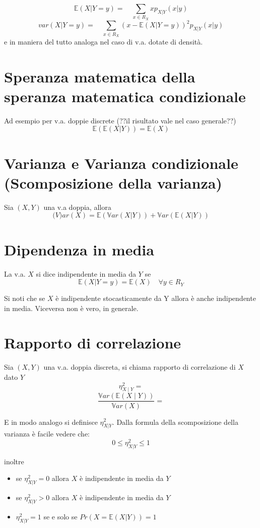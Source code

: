 \documentclass[a4paper]{report}
\begin{document}
  \[\mathbb{E}(X|Y=y)= \quad \sum_{x \in R_X} x p_{X|Y}(x|y) \]
  \[ var(X|Y=y)= \quad \sum_{x\in R_X}(x - \mathbb{E}(X|Y=y))^2 p_{X|Y}(x|y) \]
  e in maniera del tutto analoga nel caso di v.a. dotate di densità.

  \section{Speranza matematica della speranza matematica condizionale}
  Ad esempio per v.a. doppie discrete (??il risultato vale nel caso generale??)
  \[ \mathbb{E}(\mathbb{E}(X|Y)) = \mathbb{E}(X) \]

  \section{Varianza e Varianza condizionale (Scomposizione della varianza)}
  Sia $(X,Y)$ una v.a doppia, allora
  \[ \mathbb(V)ar(X) = \mathbb{E}(\mathbb{V}ar(X|Y)) + \mathbb{V}ar(\mathbb{E}(X|Y)) \]

  \section{Dipendenza in media}
  La v.a. $X$ si dice indipendente in media da $Y$ se
  \[ \mathbb{E}(X|Y=y) = \mathbb{E}(X) \quad \forall y \in R_Y \]

  Si noti che se $X$ è indipendente stocasticamente da Y allora è anche indipendente in media. Viceversa non è vero, in generale.

  \section{Rapporto di correlazione}
  Sia $(X,Y)$ una v.a. doppia discreta, si chiama rapporto di correlazione di $X$ dato $Y$
  \[
  \eta^2_{X\mid Y} =
  \]
  \[
  \frac{ \mathbb{V}ar(\mathbb{E}(X \mid Y)) }{ \mathbb{V}ar(X) } =
  \]

  E in modo analogo si definisce $\eta_{X|Y}^2$. Dalla formula della scomposizione della varianza è facile vedere che:
  \[ 0 \leqslant \eta_{X|Y}^2 \leqslant 1 \]

  inoltre
  \begin{itemize}
    \item se $\eta_{X|Y}^2 = 0$ allora $X$ è indipendente in media da $Y$
    \item se $\eta_{X|Y}^2 > 0$ allora $X$ è indipendente in media da $Y$
    \item $\eta_{X|Y}^2 = 1$ se e solo se $Pr(X = \mathbb{E}(X|Y)) = 1$
  \end{itemize}
\end{document}
